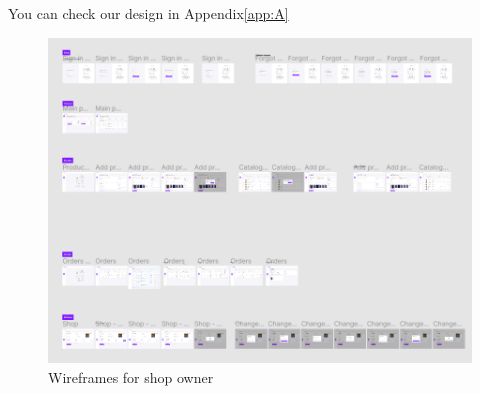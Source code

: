 You can check our design in Appendix\ref{app:A} 
\begin{figure}[h]
    \centering
    \includegraphics[scale=0.53]{figures/image005.png}
    \caption{Wireframes for shop owner}
    \label{fig:image005}
\end{figure}

